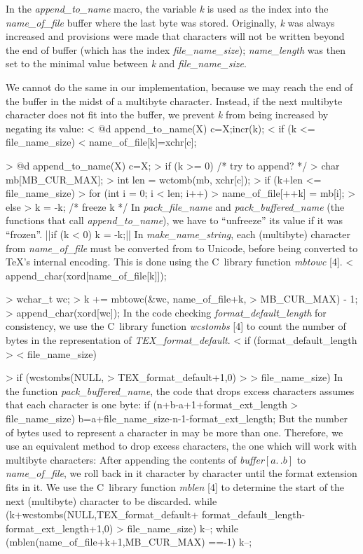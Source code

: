 In the {\it append\_to\_name\/} macro, the variable
{\it k\/}
is used as the index into the {\it name\_of\_file\/} buffer
where the last byte was stored. Originally, {\it k\/} was
always increased and provisions were made
that characters will not be written beyond the end of buffer
(which has the index {\it file\_name\_size\/});
{\it name\_length\/} was then set to the minimal value
between {\it k\/} and {\it file\_name\_size\/}.

We cannot do the same in our implementation, because we may reach
the end of the buffer
in the midst of
a multibyte character. Instead, if the next multibyte
character does not fit into the buffer, we prevent {\it k\/} from
being increased by negating its value:
\verbatim
< @d append_to_name(X) { c=X;incr(k);
<   if (k <= file_name_size)
<     name_of_file[k]=xchr[c]; }

> @d append_to_name(X) { c=X;
>   if (k >= 0) { /* try to append? */
>     char mb[MB_CUR_MAX];
>     int len = wctomb(mb, xchr[c]);
>     if (k+len <= file_name_size)
>       for (int i = 0; i < len; i++)
>         name_of_file[++k] = mb[i];
>     else
>       k = -k; /* freeze k */ } }
\endverbatim
\medskip
In {\it pack\_file\_name\/} and {\it pack\_buffered\_name\/}
(the functions that call {\it append\_to\_name\/}),
we have to ``unfreeze'' its value
if it was ``frozen''.
||if (k < 0) k = -k;||
\medskip
In {\it make\_name\_string},
each (multibyte) character from {\it name\_of\_file\/}
must be converted from  to Unicode,
before being converted to \TeX's internal encoding.
This is done using the C~library function
{\it mbtowc\/} [4].
\verbatim
< append_char(xord[name_of_file[k]]);

> { wchar_t wc;
>   k += mbtowc(&wc, name_of_file+k,
>               MB_CUR_MAX) - 1;
>   append_char(xord[wc]); }
\endverbatim
\medskip
In the code checking {\it format\_default\_length\/}
for consistency, we
use the C~library function {\it wcstombs\/} [4] to count
the number of bytes in the  representation of
{\it TEX\_format\_default\/}.
\verbatim
< if (format_default_length >
<     file_name_size)

> if (wcstombs(NULL,
>     TEX_format_default+1,0) >
>     file_name_size)
\endverbatim
\medskip
In the function {\it pack\_buffered\_name\/},
the code that drops excess characters
assumes that each character is one byte:
\verbatim
if (n+b-a+1+format_ext_length >
    file_name_size)
  b=a+file_name_size-n-1-format_ext_length;
\endverbatim
But the number of bytes used to represent
a character in \hbox{} may be more than one.
Therefore, we use an equivalent method to drop excess
characters, the one which will work with multibyte characters:
After appending
the contents of
{\it buffer\/$[a\mathrel{.\,.}b]$\/}
to {\it name\_of\_file\/}, we roll back in it
character by character until the
format extension fits in it. We use the C~library
function {\it mblen\/} [4] to determine
the start of the next (multibyte) character to be discarded.
\verbatim
while (k+wcstombs(NULL,TEX_format_default+
       format_default_length-
       format_ext_length+1,0) >
       file_name_size) {
  k--;
  while (mblen(name_of_file+k+1,MB_CUR_MAX)
         ==-1)
    k--;
}
\endverbatim

